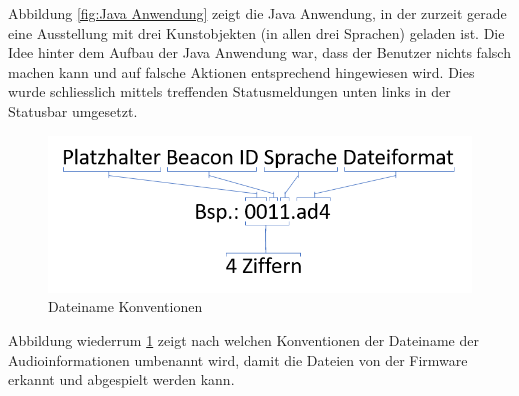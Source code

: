 Abbildung \ref{fig:Java Anwendung} zeigt die Java Anwendung, in der zurzeit gerade eine Ausstellung mit  drei Kunstobjekten (in allen drei Sprachen) geladen ist. Die Idee hinter dem Aufbau der Java Anwendung war, dass der Benutzer nichts falsch machen kann und auf falsche Aktionen entsprechend hingewiesen wird. Dies wurde schliesslich mittels treffenden Statusmeldungen unten links in der Statusbar umgesetzt.

\begin{figure}[htb]
	\centering
	\includegraphics[width=\textwidth]{graphics/Dateiname.png}
	\caption{Dateiname Konventionen}
	\label{fig:Dateiname Konventionen}
\end{figure}

Abbildung wiederrum \ref{fig:Dateiname Konventionen} zeigt nach welchen Konventionen der Dateiname der Audioinformationen umbenannt wird, damit die Dateien von der Firmware erkannt und abgespielt werden kann.
